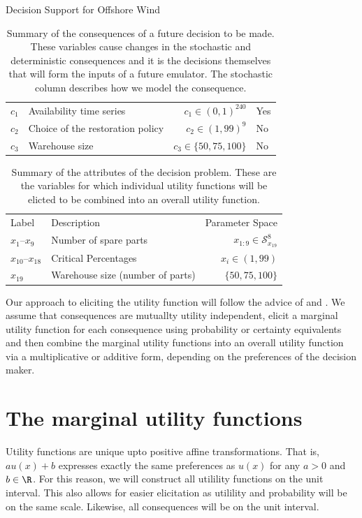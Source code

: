 \begin{chapter}{Decision Support for Offshore Wind \label{Ch:ds-for-ow}}
\begin{table}[H]
\begin{tabular}{llrl}
    $c_1$ & Availability time series & $c_1 \in (0, 1)^{240}$& Yes\\
    $c_2$ & Choice of the restoration policy &$c_2 \in  (1, 99)^9$&  No\\
    $c_3$ &  Warehouse size & $c_3 \in \{50,  75, 100\}$& No\\\bottomrule
	\end{tabular}
	\caption{Summary of the consequences of a future decision to be made. These variables cause changes in the stochastic and deterministic consequences and it is the decisions themselves that will form the inputs of a future emulator.	The stochastic column describes how we model the consequence. \label{Tab:consequences}}
\end{table}
\begin{table}[H]
	\centering
	\begin{tabular}{llr}
		\toprule
    Label & Description & Parameter Space\\\cmidrule{1-3}
    $x_1$--$x_9$ & Number of spare parts & $x_{1:9} \in \mathcal{S}^{8}_{x_{19}}$\\
    $x_{10}$--$x_{18}$ & Critical Percentages & $x_i \in (1,99)$\\
    $x_{19}$ & Warehouse size  (number of parts) & $\{ 50, 75, 100 \}$\\\bottomrule
	\end{tabular}
	\caption{Summary of the attributes of the decision problem. These are the variables for which individual utility functions will be elicted to be combined into an overall utility function.	\label{Tab:consequences}}
\end{table}
Our approach to eliciting the utility function will follow the advice of \citet{Smith2010} and \citet{Keeney1976}.  We assume that consequences are mutuallty utility independent, elicit a marginal utility function for each consequence using probability or certainty equivalents and then combine the marginal utility functions into an overall utility function via a multiplicative or additive form, depending on the preferences of the decision maker.
\section{The marginal utility functions}
Utility functions are unique upto positive affine transformations. That is, $au(x) + b$ expresses exactly the same preferences as $u(x)$ for any $a > 0$ and $b \in \R$. For this reason, we will construct all utilility functions on the unit interval. This also allows for easier elicitation as utilility and probability will be on the same scale. Likewise, all consequences will be on the unit interval.

\end{chapter}
